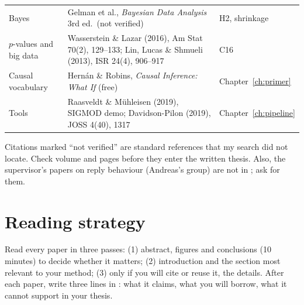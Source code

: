 \begin{tabularx}{\textwidth}{@{}l Y l@{}}
Bayes & Gelman et al., \emph{Bayesian Data Analysis} 3rd ed.\ (not verified) & H2, shrinkage \\
$p$-values and big data & Wasserstein \& Lazar (2016), Am Stat 70(2), 129--133; Lin, Lucas \& Shmueli (2013), ISR 24(4), 906--917 & C16 \\
Causal vocabulary & Hern\'an \& Robins, \emph{Causal Inference: What If} (free) & Chapter~\ref{ch:primer} \\
Tools & Raasveldt \& M\"uhleisen (2019), SIGMOD demo; Davidson-Pilon (2019), JOSS 4(40), 1317 & Chapter~\ref{ch:pipeline} \\
\bottomrule
\end{tabularx}

\begin{pitfall}
Citations marked ``not verified'' are standard references that my search did not locate. Check volume and pages before they enter the written thesis. Also, the supervisor's papers on reply behaviour (Andreas's group) are not in ; ask for them.
\end{pitfall}

\section{Reading strategy}
Read every paper in three passes: (1) abstract, figures and conclusions (10 minutes) to decide whether it matters; (2) introduction and the section most relevant to your method; (3) only if you will cite or reuse it, the details. After each paper, write three lines in : what it claims, what you will borrow, what it cannot support in your thesis.
